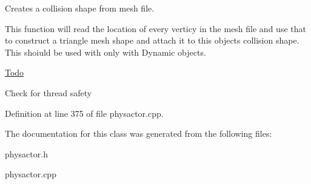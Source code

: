 Creates a collision shape from mesh file. 

This function will read the location of every verticy in the mesh file and use that to construct a triangle mesh shape and attach it to this objects collision shape. This shoiuld be used with only with Dynamic objects. 

\begin{Desc}
\item[\hyperlink{todo__todo000011}{Todo}]
\begin{DoxyItemize}
\item Check for thread safety 
\end{DoxyItemize}\end{Desc}




Definition at line 375 of file physactor.cpp.



The documentation for this class was generated from the following files:\begin{DoxyCompactItemize}
\item 
physactor.h\item 
physactor.cpp\end{DoxyCompactItemize}
